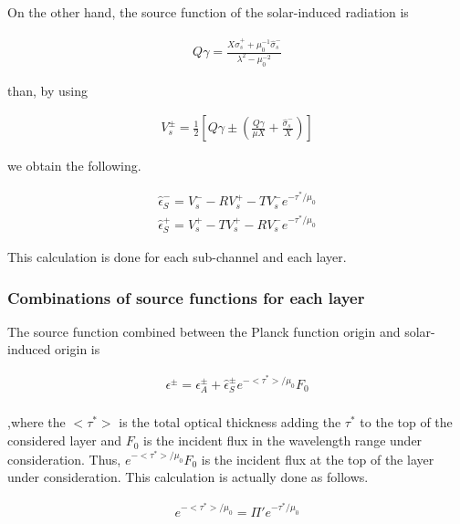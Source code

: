 On the other hand, the source function of the solar-induced radiation is

\begin{eqnarray}
  Q\gamma = \frac{X\hat{\sigma}_s^+ + \mu_0^{-1} \hat{\sigma}_s^-}
                 {\lambda^2 - \mu_0^{-2} }
\end{eqnarray}

than, by using

\begin{eqnarray}
  V_s^\pm = \frac{1}{2} \left[
             Q\gamma \pm \left( \frac{Q\gamma}{\mu X} 
                                + \frac{\hat{\sigma}_s^-}{X} \right)
                        \right]
\end{eqnarray}

we obtain the following.

\begin{eqnarray}
  \hat{\epsilon}_S^-  =  V_s^- - R V_s^+ - T V_s^- e^{-\tau^*/\mu_0} \\
  \hat{\epsilon}_S^+  =  V_s^+ - T V_s^+ - R V_s^- e^{-\tau^*/\mu_0}
\end{eqnarray}

This calculation is done for each sub-channel and each layer.

\hypertarget{combinations-of-source-functions-for-each-layer}{%
\subsubsection{Combinations of source functions for each
layer}\label{combinations-of-source-functions-for-each-layer}}

The source function combined between the Planck function origin and solar-induced origin is

\begin{eqnarray}
  \epsilon^\pm  = 
  \epsilon_A^\pm + \hat{\epsilon}_S^\pm e^{-<\tau^*>/\mu_0} F_0 \\
\end{eqnarray}

,where the \(<\tau^*>\) is the total optical thickness adding the \(\tau^*\) to the top of 
the considered layer and \(F_0\) is the incident flux in the wavelength range under consideration. 
Thus, \(e^{-<\tau^*>/\mu_0} F_0\) is the incident flux at the top of the layer under consideration. 
This calculation is actually done as follows.

\begin{eqnarray}
  e^{-<\tau^*>/\mu_0} = \Pi' e^{-\tau^*/\mu_0}
\end{eqnarray}

